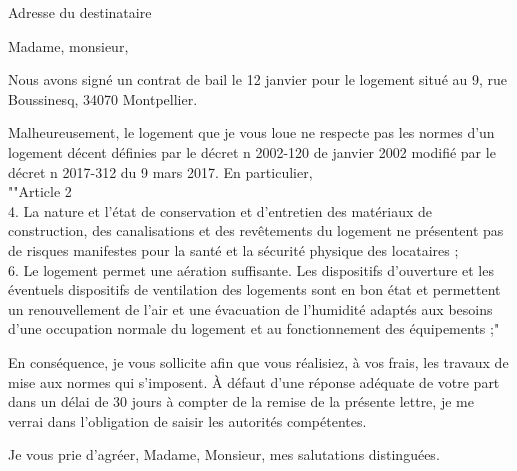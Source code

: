 \documentclass[11pt]{lettre}
\begin{document}
	\begin{letter}{Adresse du destinataire}
		\signature{Cédric \textsc{Jourdain}}
		\address{9, rue boussinesq}

		\opening{Madame, monsieur,}
		Nous  avons signé un contrat de bail le 12 janvier pour le logement situé au 9, rue Boussinesq, 34070 Montpellier.

		Malheureusement,  le logement que je vous loue ne respecte pas les normes d'un logement décent définies par le décret n 2002-120  de janvier 2002 modifié par le décret n 2017-312 du 9 mars 2017. En particulier, \\%
""Article 2 \\
4. La nature et l'état de conservation et d'entretien des matériaux de construction, des canalisations et des revêtements du logement ne présentent pas de risques manifestes pour la santé et la sécurité physique des locataires ;\\
6. Le logement permet une aération suffisante. Les dispositifs d'ouverture et les éventuels dispositifs de ventilation des logements sont en bon état et permettent un renouvellement de l'air et une évacuation de l'humidité adaptés aux besoins d'une occupation normale du logement et au fonctionnement des équipements ;"

En conséquence, je vous sollicite afin que vous réalisiez, à vos frais, les travaux de mise aux normes qui s'imposent. À défaut d’une réponse adéquate de votre
 part dans un délai de 30 jours à compter de la remise de la présente lettre, je me verrai dans l’obligation de saisir les autorités compétentes.
 
		\closing{Je vous prie d’agréer, Madame, Monsieur, mes salutations distinguées.}
 
	\end{letter}
\end{document}
